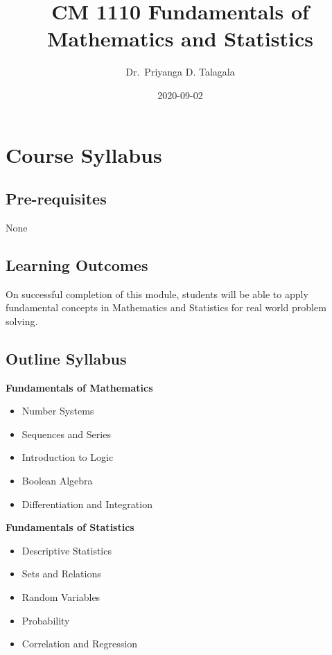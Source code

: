 \documentclass[]{book}
\title{CM 1110 Fundamentals of Mathematics and Statistics}
\author{Dr.~Priyanga D. Talagala}
\date{2020-09-02}
\providecommand{\tightlist}{%
  \setlength{\itemsep}{0pt}\setlength{\parskip}{0pt}}
\begin{document}
\maketitle

{
\setcounter{tocdepth}{1}
\tableofcontents
}
\hypertarget{course-syllabus}{%
\chapter*{Course Syllabus}\label{course-syllabus}}

\hypertarget{pre-requisites}{%
\section*{Pre-requisites}\label{pre-requisites}}

None

\hypertarget{learning-outcomes}{%
\section*{Learning Outcomes}\label{learning-outcomes}}

On successful completion of this module, students will be able to apply fundamental concepts in Mathematics and Statistics for real world problem solving.

\hypertarget{outline-syllabus}{%
\section*{Outline Syllabus}\label{outline-syllabus}}

\textbf{Fundamentals of Mathematics}

\begin{itemize}
\tightlist
\item
  Number Systems
\item
  Sequences and Series
\item
  Introduction to Logic
\item
  Boolean Algebra
\item
  Differentiation and Integration
\end{itemize}

\textbf{Fundamentals of Statistics}

\begin{itemize}
\tightlist
\item
  Descriptive Statistics
\item
  Sets and Relations
\item
  Random Variables
\item
  Probability
\item
  Correlation and Regression
\end{itemize}
\end{document}
